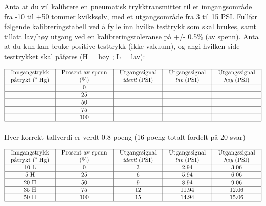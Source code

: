 
Anta at du vil kalibrere en pneumatisk trykktransmitter til et inngangsområde fra -10 til +50 tommer kvikksølv, med et utgangsområde fra 3 til 15 PSI. Fullfør følgende kalibreringstabell ved å fylle inn hvilke testtrykk som skal brukes, samt tillatt lav/høy utgang ved en kalibreringstoleranse på +/- 0.5\% (av spenn). Anta at du kun kan bruke positive testtrykk (ikke vakuum), og angi hvilken side testtrykket skal påføres (H = høy ; L = lav):


$$\vbox{\offinterlineskip
\halign{\strut
\vrule \quad\hfil # \ \hfil &
\vrule \quad\hfil # \ \hfil &
\vrule \quad\hfil # \ \hfil &
\vrule \quad\hfil # \ \hfil &
\vrule \quad\hfil # \ \hfil \vrule \cr
\noalign{\hrule}
%
Inngangstrykk & Prosent av spenn & Utgangssignal & Utgangssignal & Utgangssignal \cr
%
påtrykt (" Hg) & (\%) & {\it ideelt} (PSI) & {\it lav} (PSI) & {\it høy} (PSI) \cr
%
\noalign{\hrule}
%
 & 0 & & & \cr
%
\noalign{\hrule}
%
 & 25 & & & \cr
%
\noalign{\hrule}
%
 & 50 & & & \cr
%
\noalign{\hrule}
%
 & 75 & & & \cr
%
\noalign{\hrule}
%
 & 100 & & & \cr
%
\noalign{\hrule}
} %
}$$ %

\vskip 10pt

\noindent
Hver korrekt tallverdi er verdt 0.8 poeng (16 poeng totalt fordelt på 20 svar)








$$\vbox{\offinterlineskip
\halign{\strut
\vrule \quad\hfil # \ \hfil &
\vrule \quad\hfil # \ \hfil &
\vrule \quad\hfil # \ \hfil &
\vrule \quad\hfil # \ \hfil &
\vrule \quad\hfil # \ \hfil \vrule \cr
\noalign{\hrule}
%
Inngangstrykk & Prosent av spenn & Utgangssignal & Utgangssignal & Utgangssignal \cr
%
påtrykt (" Hg) & (\%) & {\it ideelt} (PSI) & {\it lav} (PSI) & {\it høy} (PSI) \cr
%
\noalign{\hrule}
%
10 L & 0 & 3 & 2.94 & 3.06 \cr
%
\noalign{\hrule}
%
5 H & 25 & 6 & 5.94 & 6.06 \cr
%
\noalign{\hrule}
%
20 H & 50 & 9 & 8.94 & 9.06 \cr
%
\noalign{\hrule}
%
35 H & 75 & 12 & 11.94 & 12.06 \cr
%
\noalign{\hrule}
%
50 H & 100 & 15 & 14.94 & 15.06 \cr
%
\noalign{\hrule}
} %
}$$ %








